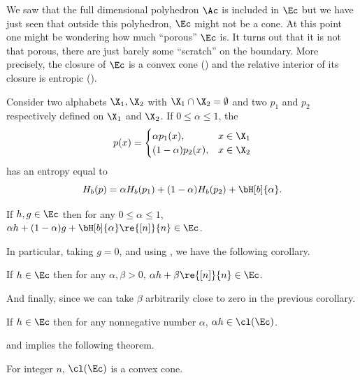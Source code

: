 \documentclass[11pt,twoside,a4paper,openright]{uclouvain-thesis}
\begin{document}
We saw that the full dimensional polyhedron $\Ac$ is included in $\Ec$ but we have just seen that outside this polyhedron, $\Ec$ might not be a cone.
At this point one might be wondering how much ``porous'' $\Ec$ is.
It turns out that it is not that porous, there are just barely some ``scratch'' on the boundary.
More precisely, the closure of $\Ec$ is a convex cone () and the relative interior of its closure is entropic ().

\begin{mylem}
  Consider two alphabets $\X_1, \X_2$ with $\X_1 \cap \X_2 = \emptyset$ and two \pmfs{}
  $p_1$ and $p_2$ respectively defined on $\X_1$ and $\X_2$.
  If $0 \leq \alpha \leq 1$, the \pmf
  \[
    p(x) =
    \begin{cases}
      \alpha p_1(x), & x \in \X_1\\
      (1-\alpha) p_2(x), & x \in \X_2
    \end{cases}
  \]
  has an entropy equal to
  \[ H_b(p) = \alpha H_b(p_1) + (1-\alpha) H_b(p_2) + \bH[b]{\alpha}. \]
\end{mylem}

\begin{mycoro}
  If $h, g \in \Ec$ then for any $0 \leq \alpha \leq 1$,
  $\alpha h + (1-\alpha) g + \bH[b]{\alpha} \re{[n]}{n} \in \Ec$.
\end{mycoro}

In particular, taking $g = 0$, and using , we have the following corollary.

\begin{mycoro}
  If $h \in \Ec$ then for any $\alpha, \beta > 0$,
  $\alpha h + \beta \re{[n]}{n} \in \Ec$.
\end{mycoro}

And finally, since we can take $\beta$ arbitrarily close to zero in the previous corollary.

\begin{mycoro}
  \label{coro:nonnegativemult}
  If $h \in \Ec$ then for any nonnegative number $\alpha$, $\alpha h \in \cl(\Ec)$.
\end{mycoro}

 and  implies the following theorem.

\begin{mytheo}
  \label{theo:convexcone}
  For integer $n$, $\cl(\Ec)$ is a convex cone.
\end{mytheo}
\end{document}
